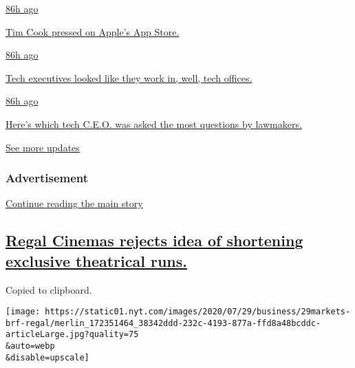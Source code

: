 \href{https://www.nytimes.com/live/2020/07/29/technology/tech-ceos-hearing-testimony\#tim-cook-pressed-on-apples-app-store}{86h
ago}

\href{https://www.nytimes.com/live/2020/07/29/technology/tech-ceos-hearing-testimony\#tim-cook-pressed-on-apples-app-store}{Tim
Cook pressed on Apple's App Store.}

\href{https://www.nytimes.com/live/2020/07/29/technology/tech-ceos-hearing-testimony\#tech-executives-looked-like-they-work-in-well-tech-offices}{86h
ago}

\href{https://www.nytimes.com/live/2020/07/29/technology/tech-ceos-hearing-testimony\#tech-executives-looked-like-they-work-in-well-tech-offices}{Tech
executives looked like they work in, well, tech offices.}

\href{https://www.nytimes.com/live/2020/07/29/technology/tech-ceos-hearing-testimony\#heres-which-tech-ceo-was-asked-the-most-questions-by-lawmakers}{86h
ago}

\href{https://www.nytimes.com/live/2020/07/29/technology/tech-ceos-hearing-testimony\#heres-which-tech-ceo-was-asked-the-most-questions-by-lawmakers}{Here's
which tech C.E.O. was asked the most questions by lawmakers.}

\href{https://www.nytimes.com/live/2020/07/29/technology/tech-ceos-hearing-testimony}{See
more updates}

\hypertarget{advertisement}{%
\subsubsection{Advertisement}\label{advertisement}}

\protect\hyperlink{after-dfp-ad-mid1}{Continue reading the main story}

\hypertarget{regal-cinemas-rejects-idea-of-shortening-exclusive-theatrical-runs}{%
\subsection{\texorpdfstring{\protect\hyperlink{regal-cinemas-rejects-idea-of-shortening-exclusive-theatrical-runs}{Regal
Cinemas rejects idea of shortening exclusive theatrical
runs.}}{Regal Cinemas rejects idea of shortening exclusive theatrical runs.}}\label{regal-cinemas-rejects-idea-of-shortening-exclusive-theatrical-runs}}

Copied to clipboard.

\texttt{[image: https://static01.nyt.com/images/2020/07/29/business/29markets-brf-regal/merlin\_172351464\_38342ddd-232c-4193-877a-ffd8a48bcddc-articleLarge.jpg?quality=75\\\&auto=webp\\\&disable=upscale]}

